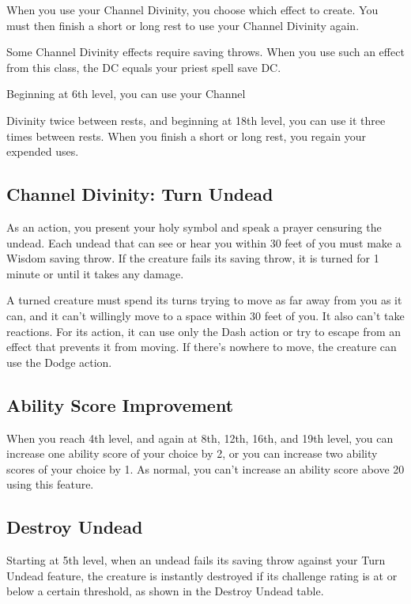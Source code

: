 When you use your Channel Divinity, you choose which effect to create. You must then finish a short or long rest to use your Channel Divinity again.

Some Channel Divinity effects require saving throws. When you use such an effect from this class, the DC equals your priest spell save DC.

Beginning at 6th level, you can use your Channel

Divinity twice between rests, and beginning at 18th level, you can use it three times between rests. When you finish a short or long rest, you regain your expended uses.

\subsection{Channel Divinity: Turn Undead}

As an action, you present your holy symbol and speak a prayer censuring the undead. Each undead that can see or hear you within 30 feet of you must make a Wisdom saving throw. If the creature fails its saving throw, it is turned for 1 minute or until it takes any damage.

A turned creature must spend its turns trying to move as far away from you as it can, and it can’t willingly move to a space within 30 feet of you. It also can’t take reactions. For its action, it can use only the Dash action or try to escape from an effect that prevents it from moving. If there’s nowhere to move, the creature can use the Dodge action.

\subsection{Ability Score Improvement}

When you reach 4th level, and again at 8th, 12th, 16th, and 19th level, you can increase one ability score of your choice by 2, or you can increase two ability scores of your choice by 1. As normal, you can’t increase an ability score above 20 using this feature.

\subsection{Destroy Undead}

Starting at 5th level, when an undead fails its saving throw against your Turn Undead feature, the creature is instantly destroyed if its challenge rating is at or below a certain threshold, as shown in the Destroy Undead table.

